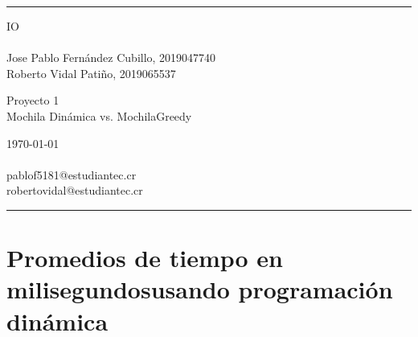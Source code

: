 \documentclass[a4paper]{article}
\begin{document}

\fancyhead[C]{}
\hrule \medskip %
\begin{minipage}{0.295\textwidth} %
\raggedright
IO\\ %
\footnotesize %
\hfill\\
Jose Pablo Fernández Cubillo, 2019047740 \\%
Roberto Vidal Patiño, 2019065537%
\end{minipage}
\begin{minipage}{0.4\textwidth} %
\centering 
\large %
Proyecto 1\\ %
\normalsize %
Mochila Dinámica vs. MochilaGreedy\\ %
\end{minipage}
\begin{minipage}{0.295\textwidth} %
\raggedleft
\today\\ %
\footnotesize %
\hfill\\
pablof5181@estudiantec.cr\\
robertovidal@estudiantec.cr%
\end{minipage}
\medskip\hrule %
\bigskip

\section{Promedios de tiempo en milisegundosusando programación dinámica}
\end{document}

